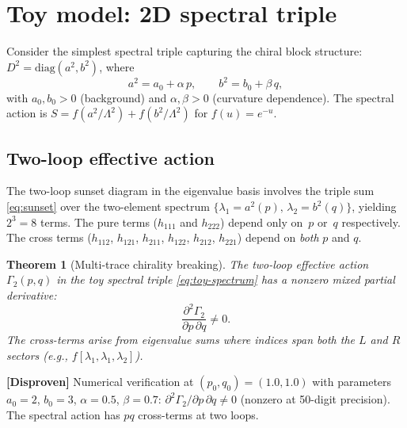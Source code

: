 \documentclass[11pt,a4paper]{article}
\newtheorem{theorem}{Theorem}[section]
\theoremstyle{definition}
\newcommand{\disproof}[1]{%
  \par\smallskip\noindent
  \colorbox{red!10}{\parbox{\dimexpr\linewidth-2\fboxsep}{%
    \textcolor{disproven}{\textbf{[Disproven]}} #1}}%
  \par\smallskip}
\begin{document}
\section{Toy model: 2D spectral triple}\label{sec:toy}

Consider the simplest spectral triple capturing the chiral block structure:
$D^2 = \mathrm{diag}(a^2, b^2)$, where
\begin{equation}\label{eq:toy-spectrum}
  a^2 = a_0 + \alpha\, p, \qquad b^2 = b_0 + \beta\, q,
\end{equation}
with $a_0, b_0 > 0$ (background) and $\alpha, \beta > 0$ (curvature
dependence).  The spectral action is
$S = f(a^2/\Lambda^2) + f(b^2/\Lambda^2)$
for $f(u) = e^{-u}$.

\subsection{Two-loop effective action}

The two-loop sunset diagram in the eigenvalue basis involves the
triple sum \eqref{eq:sunset} over the two-element spectrum
$\{\lambda_1 = a^2(p),\, \lambda_2 = b^2(q)\}$, yielding $2^3 = 8$ terms.
The pure terms ($h_{111}$ and $h_{222}$) depend only on~$p$ or~$q$
respectively.  The cross terms ($h_{112}$, $h_{121}$, $h_{211}$, $h_{122}$,
$h_{212}$, $h_{221}$) depend on \emph{both} $p$ and $q$.

\begin{theorem}[Multi-trace chirality breaking]\label{thm:chirality-breaking}
The two-loop effective action $\Gamma_2(p,q)$ in the toy spectral triple
\eqref{eq:toy-spectrum} has a nonzero mixed partial derivative:
\begin{equation}\label{eq:mixed-partial}
  \frac{\partial^2 \Gamma_2}{\partial p\,\partial q} \neq 0.
\end{equation}
The cross-terms arise from eigenvalue sums where indices span both the $L$ and
$R$ sectors (e.g., $f[\lambda_1, \lambda_1, \lambda_2]$).
\end{theorem}

\disproof{%
  Numerical verification at $(p_0, q_0) = (1.0, 1.0)$ with parameters
  $a_0 = 2$, $b_0 = 3$, $\alpha = 0.5$, $\beta = 0.7$:
  $\partial^2\Gamma_2/\partial p\,\partial q \neq 0$ (nonzero at 50-digit
  precision).  The spectral action has $pq$ cross-terms at two loops.}
\end{document}
